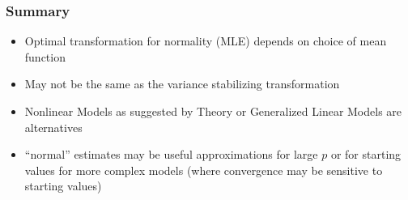 \documentclass[]{beamer}
\begin{document}
\begin{frame}\frametitle{Summary}
  \begin{itemize}
  \item Optimal transformation for normality (MLE) depends on choice
    of mean function \pause
 \item May not be the same as the variance stabilizing transformation \pause
 \item Nonlinear Models as suggested by Theory or Generalized Linear
   Models are alternatives \pause
 \item ``normal'' estimates may be useful approximations for large $p$
   or for starting values for more complex models  (where convergence
   may be sensitive to starting values)
  \end{itemize}
\end{frame}
\end{document}
